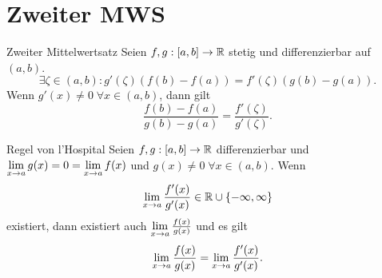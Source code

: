 \documentclass[main.tex]{subfiles}
\begin{document}
\section*{Zweiter MWS}

\begin{karte}{Zweiter Mittelwertsatz}
    Seien \( f,g : [a,b] \rightarrow \mathbb{R} \) stetig und differenzierbar 
    auf \( (a, b) \).
    \[ \exists \zeta \in (a, b):
    g'(\zeta)(f(b) - f(a)) = f'(\zeta)(g(b) - g(a)). \]
    Wenn \( g'(x) \neq 0 \; \forall x \in (a, b) \), dann gilt 
    \[ \frac{f(b) - f(a)}{g(b) - g(a)} = \frac{f'(\zeta)}{g'(\zeta)}. \]
\end{karte}
\begin{karte}{Regel von l'Hospital}
    Seien \( f,g : [a,b] \rightarrow \mathbb{R} \) differenzierbar 
    und \( \lim\limits_{x\rightarrow a} g(x) = 0 = \lim\limits_{x\rightarrow a} f(x) \)
    und \( g(x) \neq 0 \;\forall x \in (a, b) \).
    Wenn 
    \[ \lim\limits_{x\rightarrow a} \frac{f'(x)}{g'(x)} \in \mathbb{R} \cup \{-\infty, \infty\} \]
    existiert, dann existiert auch \( \lim\limits_{x\rightarrow a} \frac{f(x)}{g(x)} \)
    und es gilt 
    \[ \lim\limits_{x\rightarrow a} \frac{f(x)}{g(x)} = \lim\limits_{x\rightarrow a} \frac{f'(x)}{g'(x)}. \]
\end{karte}
\end{document}
